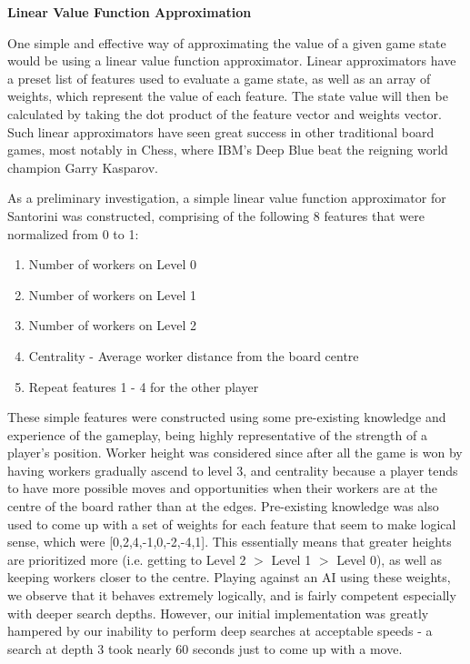\documentclass[a4paper,12pt,table]{article}
\begin{document}
\vspace{1.5cm}
\textbf{Linear Value Function Approximation}
\newline

One simple and effective way of approximating the value of a given game state would be using a linear value function approximator. Linear approximators have a preset list of features used to evaluate a game state, as well as an array of weights, which represent the value of each feature. The state value will then be calculated by taking the dot product of the feature vector and weights vector. Such linear approximators have seen great success in other traditional board games, most notably in Chess, where IBM’s Deep Blue beat the reigning world champion Garry Kasparov. \par

As a preliminary investigation, a simple linear value function approximator for Santorini was constructed, comprising of the following 8 features that were normalized from 0 to 1:
\begin{enumerate}
    \item Number of workers on Level 0
    \item Number of workers on Level 1
    \item Number of workers on Level 2
    \item Centrality - Average worker distance from the board centre
    \item Repeat features 1 - 4 for the other player
\end{enumerate}

These simple features were constructed using some pre-existing knowledge and experience of the gameplay, being highly representative of the strength of a player’s position. Worker height was considered since after all the game is won by having workers gradually ascend to level 3, and centrality because a player tends to have more possible moves and opportunities when their workers are at the centre of the board rather than at the edges. Pre-existing knowledge was also used to come up with a set of weights for each feature that seem to make logical sense, which were [0,2,4,-1,0,-2,-4,1]. This essentially means that greater heights are prioritized more (i.e. getting to Level 2 $>$ Level 1 $>$ Level 0), as well as keeping workers closer to the centre. Playing against an AI using these weights, we observe that it behaves extremely logically, and is fairly competent especially with deeper search depths. However, our initial implementation was greatly hampered by our inability to perform deep searches at acceptable speeds - a search at depth 3 took nearly 60 seconds just to come up with a move. \par
\end{document}
